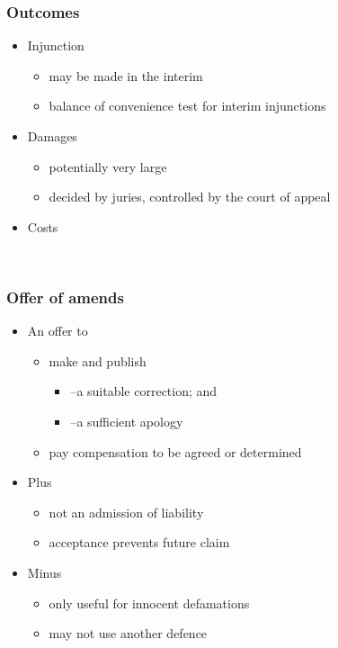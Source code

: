 \documentclass[ignorenonframetext,]{beamer}
\begin{document}
\begin{frame}
\frametitle{Outcomes}

\begin{itemize}
\item  Injunction

  \begin{itemize}
  \item    may be made in the interim
  \item    balance of convenience test for interim injunctions
  \end{itemize}
\item  Damages

  \begin{itemize}
  \item    potentially very large
  \item    decided by juries, controlled by the court of appeal
  \end{itemize}
\item  Costs
\end{itemize}

~


\end{frame}

\begin{frame}
\frametitle{Offer of amends}

\begin{itemize}
\item  An offer to

  \begin{itemize}
  \item    make and publish

    \begin{itemize}
    \item      {--}a suitable correction; and
    \item      {--}a sufficient apology
    \end{itemize}
  \item    {pay }{compensation to be agreed or determined}
  \end{itemize}
\item  {Plus}

  \begin{itemize}
  \item    {not an admission of liability}
  \item    {acceptance prevents future claim}
  \end{itemize}
\item  {Minus}

  \begin{itemize}
  \item    {only useful for innocent defamations}
  \item    {may not use another defence}
  \end{itemize}
\end{itemize}

\end{frame}
\end{document}
